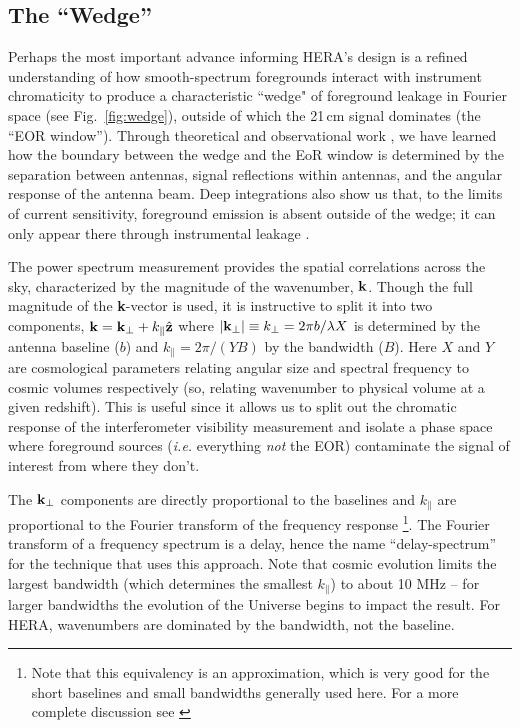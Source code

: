 \documentclass[preprint,11pt]{aastex}
\newcommand{\kvec}{{\bf k}}
\newcommand{\kpr}{{k_\perp}}
\newcommand{\kvpr}{{\kvec_\perp}}
\def\kpar{k_{\|}}
\begin{document}
\subsection{The ``Wedge''}
\label{sec:wedge}
Perhaps the most important advance informing HERA's design is a
refined understanding of how smooth-spectrum foregrounds interact
with instrument chromaticity to produce a characteristic ``wedge" of
foreground leakage in Fourier space (see Fig.~\ref{fig:wedge}), 
outside of which the 21\,cm signal dominates (the ``EOR window'').  
Through theoretical and observational work
\citep{datta_etal2010,morales_et_al2012,parsons_et_al2012b,vedantham_2012,thyagarajan_et_al2013,hazelton_et_al2013,pober_etal2013b,liu_et_al2014a,liu_et_al2014b},
we have learned how the boundary between the wedge and  the EoR window is determined by the separation between antennas,
signal reflections within antennas, and the angular response of the antenna beam.  Deep integrations also show us
that, to the limits of current sensitivity, foreground emission is absent outside of the wedge; it can only 
appear there through instrumental leakage \citep{parsons_etal2014,ali_et_al2015,moore_et_al2016,kohn_et_al2016}.

The power spectrum measurement provides the spatial correlations across the sky, characterized by the magnitude of the wavenumber, ${\bf k}$.
Though the full magnitude of the {\bf k}-vector is used, it is instructive to split it into two components,  $\kvec =  \kvpr + \kpar{\hat {\bf z}}$ where $|\kvpr|\equiv \kpr = 2\pi b/\lambda X$ is determined by the antenna baseline ($b$) and $\kpar=2\pi/(YB)$ by the bandwidth ($B$).  Here $X$ and $Y$ are cosmological parameters relating angular size and spectral frequency to cosmic volumes respectively (so, relating wavenumber to physical volume at a given redshift).  This is useful since it allows us to split out the chromatic response of the interferometer visibility measurement and isolate a phase space where foreground sources ({\em i.e.} everything {\em not} the EOR) contaminate the signal of interest from where they don't.  

The $\kvpr$ components are directly proportional to the baselines and $\kpar$ are proportional to the Fourier transform of the frequency response \footnote{Note that this equivalency is an approximation, which is very good for the short baselines and small bandwidths generally used here.  For a more complete discussion see \cite{liu_et_al2014a,liu_et_al2014b}}.   
The Fourier transform of a frequency spectrum is a delay, hence the name ``delay-spectrum'' for the technique that uses this approach.  Note that cosmic evolution limits the largest bandwidth (which determines the smallest $\kpar$) to about 10 MHz -- for larger bandwidths the evolution of the Universe begins to impact the result.  For HERA, wavenumbers are dominated by the bandwidth, not the baseline.
\end{document}
